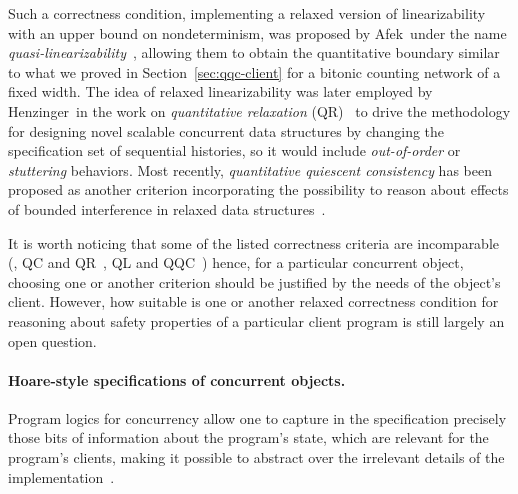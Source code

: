 Such a correctness condition, implementing a relaxed version of
linearizability with an upper bound on nondeterminism, was proposed by
Afek~\etal under the name
\emph{quasi-linearizability}~\cite{Afek-al:OPODIS10}, allowing them to
obtain the quantitative boundary similar to what we proved in
Section~\ref{sec:qqc-client} for a bitonic counting network of a fixed
width.
%
The idea of relaxed linearizability was later employed by
Henzinger~\etal in the work on \emph{quantitative
  relaxation} (QR)~\cite{Henzinger-al:POPL13} to drive the methodology
for designing novel scalable concurrent data structures by changing
the specification set of sequential histories, so it would include
\emph{out-of-order} or \emph{stuttering} behaviors.
%
Most recently, \emph{quantitative quiescent consistency} has been
proposed as another criterion incorporating the possibility to reason
about effects of bounded interference in relaxed data
structures~\cite{Jagadeesan-Riely:ICALP14}.

It is worth noticing that some of the listed correctness criteria are
incomparable (\eg, QC and QR~\cite{Henzinger-al:POPL13}, QL and
QQC~\cite{Jagadeesan-Riely:ICALP14}) hence, for a particular
concurrent object, choosing one or another criterion should be
justified by the needs of the object's client. However, how suitable
is one or another relaxed correctness condition %
for reasoning about safety properties of a particular client program
is still largely an open question.

\paragraph{Hoare-style specifications of concurrent objects.}
\label{sec:related-logic-based}

Program logics for concurrency allow one to capture in the
specification precisely those bits of information about the program's
state, which are relevant for the program's clients, making it
possible to abstract over the irrelevant details of the
implementation~\cite{DinsdaleYoung-al:ECOOP10}.

